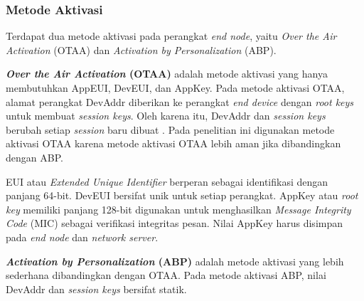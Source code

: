 \subsubsection{Metode Aktivasi}
Terdapat dua metode aktivasi pada perangkat \textit{end node}, yaitu \textit{Over the Air Activation} (OTAA) dan \textit{Activation by Personalization} (ABP).

\textbf{\textit{Over the Air Activation} (OTAA)} adalah metode aktivasi yang hanya membutuhkan AppEUI, DevEUI, dan AppKey. Pada metode aktivasi OTAA, alamat perangkat DevAddr diberikan ke perangkat \textit{end device} dengan \textit{root keys} untuk membuat \textit{session keys}. Oleh karena itu, DevAddr dan \textit{session keys} berubah setiap \textit{session} baru dibuat \cite{LoRa2017}. Pada penelitian ini digunakan metode aktivasi OTAA karena metode aktivasi OTAA lebih aman jika dibandingkan dengan ABP.

EUI atau \textit{Extended Unique Identifier} berperan sebagai identifikasi dengan panjang 64-bit. DevEUI bersifat unik untuk setiap perangkat. AppKey atau \textit{root key} memiliki panjang 128-bit digunakan untuk menghasilkan \textit{Message Integrity Code} (MIC) sebagai verifikasi integritas pesan. Nilai AppKey harus disimpan pada \textit{end node} dan \textit{network server}.

\textbf{\textit{Activation by Personalization} (ABP)} adalah metode aktivasi yang lebih sederhana dibandingkan dengan OTAA. Pada metode aktivasi ABP, nilai DevAddr dan \textit{session keys} bersifat statik.
\fi
